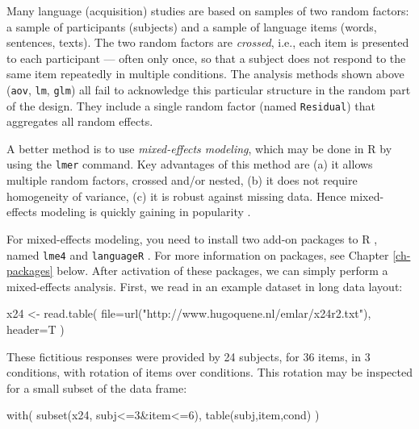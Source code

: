 \documentclass[
]{book}
\newenvironment{Shaded}{\begin{snugshade}}{\end{snugshade}}
\newcommand{\AttributeTok}[1]{\textcolor[rgb]{0.77,0.63,0.00}{#1}}
\newcommand{\DecValTok}[1]{\textcolor[rgb]{0.00,0.00,0.81}{#1}}
\newcommand{\FunctionTok}[1]{\textcolor[rgb]{0.00,0.00,0.00}{#1}}
\newcommand{\NormalTok}[1]{#1}
\newcommand{\OtherTok}[1]{\textcolor[rgb]{0.56,0.35,0.01}{#1}}
\newcommand{\SpecialCharTok}[1]{\textcolor[rgb]{0.00,0.00,0.00}{#1}}
\newcommand{\StringTok}[1]{\textcolor[rgb]{0.31,0.60,0.02}{#1}}
\begin{document}
Many language (acquisition) studies are based on samples of two random
factors: a sample of participants (subjects) and a sample of language
items (words, sentences, texts). The two random factors are \emph{crossed},
i.e., each item is presented to each participant --- often only once, so
that a subject does not respond to the same item repeatedly in multiple
conditions. The analysis methods shown above
(\texttt{aov}, \texttt{lm},
\texttt{glm}) all fail to acknowledge this particular
structure in the random part of the design. They include a single random
factor (named \texttt{Residual}) that aggregates all
random effects.

A better method is to use \emph{mixed-effects modeling},
which may be done in R by using the \texttt{lmer} command. Key
advantages of this method are (a) it allows multiple random
factors, crossed and/or nested, (b) it does not require homogeneity of
variance, (c) it is robust against missing data. Hence mixed-effects
modeling is quickly gaining in popularity
\citep{QB04, QB08, baay08, HMS18}.

For mixed-effects modeling, you need to install two add-on packages to
R , named \texttt{lme4} and \texttt{languageR} \citep{BDB08}. For more
information on packages, see Chapter \ref{ch-packages} below.
After activation of these packages, we
can simply perform a mixed-effects analysis. First, we read in an
example dataset \citep{QB08} in long data layout:

\begin{Shaded}
\begin{Highlighting}[]
\NormalTok{x24 }\OtherTok{\textless{}{-}} \FunctionTok{read.table}\NormalTok{( }\AttributeTok{file=}\FunctionTok{url}\NormalTok{(}\StringTok{"http://www.hugoquene.nl/emlar/x24r2.txt"}\NormalTok{), }\AttributeTok{header=}\NormalTok{T )}
\end{Highlighting}
\end{Shaded}

These fictitious responses were provided by 24 subjects, for 36 items,
in 3 conditions, with rotation of items over conditions. This rotation
may be inspected for a small subset of the data frame:

\begin{Shaded}
\begin{Highlighting}[]
\FunctionTok{with}\NormalTok{( }\FunctionTok{subset}\NormalTok{(x24, subj}\SpecialCharTok{\textless{}=}\DecValTok{3}\SpecialCharTok{\&}\NormalTok{item}\SpecialCharTok{\textless{}=}\DecValTok{6}\NormalTok{), }\FunctionTok{table}\NormalTok{(subj,item,cond) ) }
\end{Highlighting}
\end{Shaded}
\end{document}
